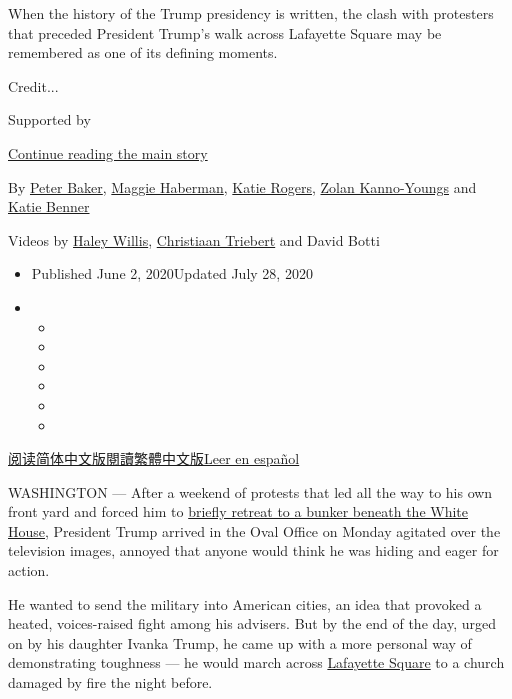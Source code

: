 When the history of the Trump presidency is written, the clash with
protesters that preceded President Trump's walk across Lafayette Square
may be remembered as one of its defining moments.

Credit...

Supported by

\protect\hyperlink{after-sponsor}{Continue reading the main story}

By \href{https://www.nytimes.com/by/peter-baker}{Peter Baker},
\href{https://www.nytimes.com/by/maggie-haberman}{Maggie Haberman},
\href{https://www.nytimes.com/by/katie-rogers}{Katie Rogers},
\href{https://www.nytimes.com/by/zolan-kanno-youngs}{Zolan Kanno-Youngs}
and \href{https://www.nytimes.com/by/katie-benner}{Katie Benner}

Videos by \href{https://www.nytimes.com/by/haley-willis}{Haley Willis},
\href{http://nytimes.com/by/christiaan-triebert}{Christiaan Triebert}
and David Botti

\begin{itemize}
\item
  Published June 2, 2020Updated July 28, 2020
\item
  \begin{itemize}
  \item
  \item
  \item
  \item
  \item
  \item
  \end{itemize}
\end{itemize}

\href{https://cn.nytimes.com/usa/20200603/trump-walk-lafayette-square/}{阅读简体中文版}\href{https://cn.nytimes.com/usa/20200603/trump-walk-lafayette-square/zh-hant/}{閱讀繁體中文版}\href{https://www.nytimes.com/es/2020/06/03/espanol/mundo/trump-foto-iglesia-protestas.html}{Leer
en español}

WASHINGTON --- After a weekend of protests that led all the way to his
own front yard and forced him to
\href{https://www.nytimes.com/2020/06/03/us/politics/trump-protests.html}{briefly
retreat to a bunker beneath the White House}, President Trump arrived in
the Oval Office on Monday agitated over the television images, annoyed
that anyone would think he was hiding and eager for action.

He wanted to send the military into American cities, an idea that
provoked a heated, voices-raised fight among his advisers. But by the
end of the day, urged on by his daughter Ivanka Trump, he came up with a
more personal way of demonstrating toughness --- he would march across
\href{https://www.nytimes.com/2020/07/28/us/politics/lafayette-square-park-police-protests.html}{Lafayette
Square} to a church damaged by fire the night before.

